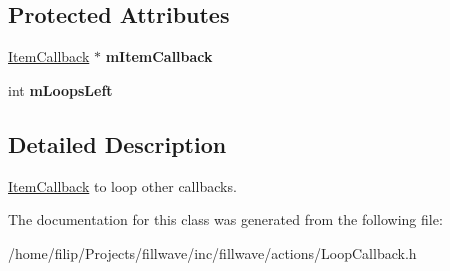 \subsection*{Protected Attributes}
\begin{DoxyCompactItemize}
\item 
\hypertarget{classfillwave_1_1actions_1_1LoopCallback_a41bf4026bd8761dbf0d3912eebf15ad8}{}\hyperlink{classfillwave_1_1actions_1_1ItemCallback}{Item\+Callback} $\ast$ {\bfseries m\+Item\+Callback}\label{classfillwave_1_1actions_1_1LoopCallback_a41bf4026bd8761dbf0d3912eebf15ad8}

\item 
\hypertarget{classfillwave_1_1actions_1_1LoopCallback_abf698e30fc8b93c3459f1739a5ee201f}{}int {\bfseries m\+Loops\+Left}\label{classfillwave_1_1actions_1_1LoopCallback_abf698e30fc8b93c3459f1739a5ee201f}

\end{DoxyCompactItemize}


\subsection{Detailed Description}
\hyperlink{classfillwave_1_1actions_1_1ItemCallback}{Item\+Callback} to loop other callbacks. 

The documentation for this class was generated from the following file\+:\begin{DoxyCompactItemize}
\item 
/home/filip/\+Projects/fillwave/inc/fillwave/actions/Loop\+Callback.\+h\end{DoxyCompactItemize}
